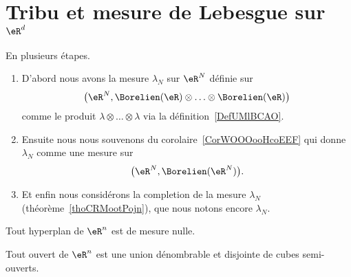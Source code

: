 \section{Tribu et mesure de Lebesgue sur \texorpdfstring{\(  \eR^d\)}{Rd}}

\begin{definition}      \label{DEFooSWJNooCSFeTF}
	En plusieurs étapes.
	\begin{enumerate}
		\item
		      D'abord nous avons la mesure \( \lambda_N\) sur \( \eR^N\) définie sur
		      \begin{equation}
			      \big( \eR^N,\Borelien(\eR)\otimes\ldots\otimes\Borelien(\eR) \big)
		      \end{equation}
		      comme le produit \( \lambda\otimes\ldots\otimes \lambda\) via la définition~\ref{DefUMlBCAO}.
		\item
		      Ensuite nous nous souvenons du corolaire~\ref{CorWOOOooHcoEEF} qui donne \( \lambda_N\) comme une mesure sur
		      \begin{equation}
			      \big( \eR^N,\Borelien(\eR^N) \big).
		      \end{equation}
		\item
		      Et enfin nous considérons la completion de la mesure \( \lambda_N\) (théorème~\ref{thoCRMootPojn}), que nous notons encore \( \lambda_N\).
	\end{enumerate}
\end{definition}

\begin{lemma}       \label{LEMooOLSMooCimcIT}
	Tout hyperplan de \( \eR^n\) est de mesure nulle.
\end{lemma}

\begin{proposition}     \label{PropSKXGooRFHQst}
	Tout ouvert de \( \eR^n\) est une union dénombrable et disjointe de cubes semi-ouverts.
\end{proposition}

